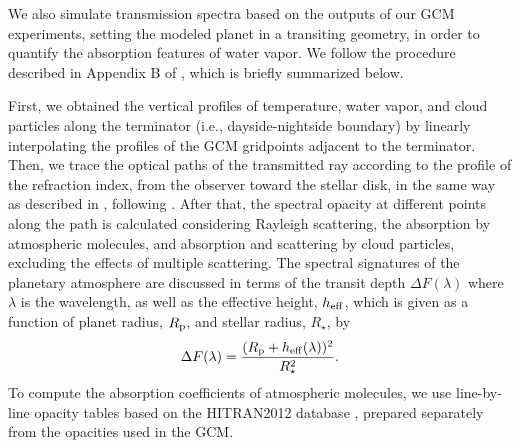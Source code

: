 \documentclass[11pt,numberedappendix,twocolappendix,]{emulateapj}
\def\wv{water vapor}
\begin{document}
We also simulate transmission spectra based on the outputs of our GCM experiments, setting the modeled planet in a transiting geometry, in order to quantify the absorption features of \wv{}.  
We follow the procedure described in Appendix B of \citet{Way2017}, which is briefly summarized below. 

First, we obtained the vertical profiles of temperature, water vapor, and cloud particles along the terminator (i.e., dayside-nightside boundary) by linearly interpolating the profiles of the GCM gridpoints adjacent to the terminator. 
Then, we trace the optical paths of the transmitted ray according to the profile of the refraction index, from the observer toward the stellar disk, in the same way as described in \citet{vanderWerf2008}, following \citet{Misra2014}. 
After that, the spectral opacity at different points along the path is calculated considering Rayleigh scattering, the absorption by atmospheric molecules, and absorption and scattering by cloud particles, excluding the effects of multiple scattering. 
The spectral signatures of the planetary atmosphere are discussed in terms of the transit depth $\Delta F(\lambda )$ where $\lambda $ is the wavelength, as well as the effective height, $h_{\rm eff}$, which is given as a function of planet radius, $R_{\rm p}$, and stellar radius, $R_{\star }$, by 
\begin{equation}
\Delta F(\lambda) = \frac{( R_{\rm p} + h_{\rm eff}(\lambda)  )^2}{R_{\star }^2}. 
\end{equation}
To compute the absorption coefficients of atmospheric molecules, we use line-by-line opacity tables based on the HITRAN2012 database \citep{Rothman2013}, prepared separately from the opacities used in the GCM. 
\end{document}
